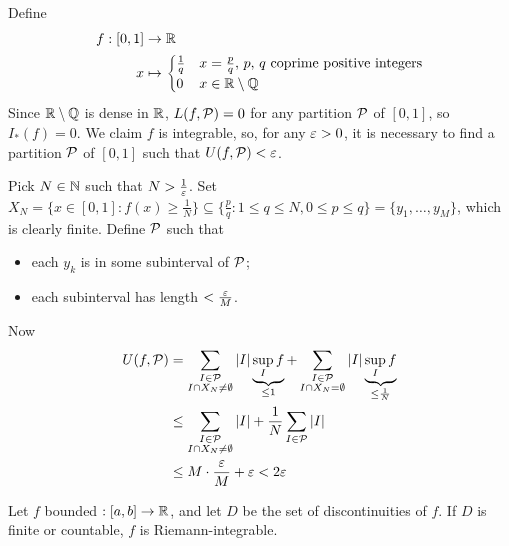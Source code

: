 \documentclass{../../template/note}
\begin{document}
    \begin{example*}
        Define
        \begin{align*}
            f: [0, 1] &\to \mathbb R \\
            x &\mapsto \begin{cases}
                \frac 1 q & x = \frac p q,\, p,\, q \text{ coprime positive integers} \\
                0 & x \in \mathbb R \setminus \mathbb Q
            \end{cases}
        \end{align*}
        Since \(\mathbb R \setminus \mathbb Q\) is dense in \(\mathbb R\), \(L(f, \mathcal{P}) = 0\) for any partition \(\mathcal{P}\) of \([0, 1]\), so \(I_*(f) = 0\). We claim \(f\) is integrable, so, for any \(\varepsilon > 0\), it is necessary to find a partition \(\mathcal{P}\) of \([0, 1]\) such that \(U(f, \mathcal{P}) < \varepsilon\).

        Pick \(N \in \mathbb N\) such that \(N > \frac 1 {\varepsilon}\). Set \(X_N = \{x \in [0, 1]: f(x) \geq \frac 1 N\} \subseteq \{\frac p q: 1 \leq q \leq N, 0 \leq p \leq q\} = \{y_1, \dots, y_M\}\), which is clearly finite. Define \(\mathcal{P}\) such that
        \begin{itemize}
            \item each \(y_k\) is in some subinterval of \(\mathcal{P}\);
            \item each subinterval has length \(< \frac{\varepsilon} M\).
        \end{itemize}
        Now
        \begin{align*}
            U(f, \mathcal{P}) &= \sum_{\substack{I \in \mathcal{P} \\ I \cap X_N \neq \emptyset}} |I| \underbrace{\sup_I f}_{\leq 1} + \sum_{\substack{I \in \mathcal{P} \\ I \cap X_N = \emptyset}} |I| \underbrace{\sup_I f}_{\leq \frac 1 N} \\ 
            &\leq \sum_{\substack{I \in \mathcal{P} \\ I \cap X_N \neq \emptyset}} |I| + \frac 1 N \sum_{I \in \mathcal{P}} |I| \\
            &\leq M \cdot \frac{\varepsilon} M + \varepsilon < 2\varepsilon
        \end{align*}
    \end{example*}
    
    \begin{proposition}
        Let \(f\) bounded \(: [a, b] \to \mathbb R\), and let \(D\) be the set of discontinuities of \(f\). If \(D\) is finite or countable, \(f\) is Riemann-integrable.
    \end{proposition}
    
\end{document}
